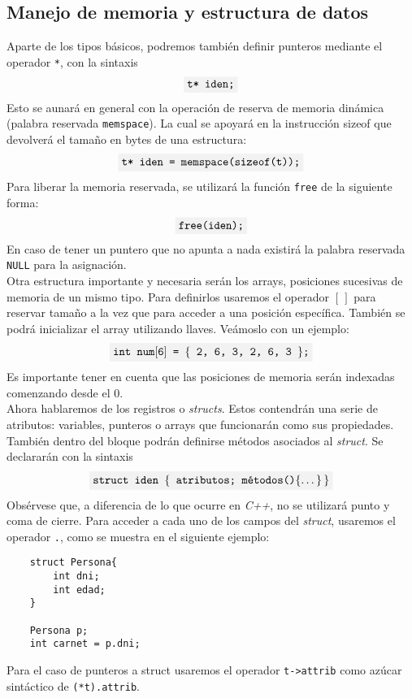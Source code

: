\documentclass[10pt a4paper]{article}
\newcommand{\code}[1]{\colorbox{light-gray}{\texttt{#1}}}
\numberwithin{equation}{section}
\begin{document}
\subsection{Manejo de memoria y estructura de datos}
Aparte de los tipos básicos, podremos también definir punteros mediante el operador \code{*}, con la sintaxis
\begin{equation*}
    \code{t* iden;}
\end{equation*}
Esto se aunará en general con la operación de reserva de memoria dinámica (palabra reservada \code{memspace}). La cual se apoyará en la instrucción sizeof que devolverá el tamaño en bytes de una estructura:
\begin{equation*}
    \code{t* iden = memspace(sizeof(t));}
\end{equation*}
Para liberar la memoria reservada, se utilizará la función \code{free} de la siguiente forma:
\begin{equation*}
    \code{free(iden);}
\end{equation*}
En caso de tener un puntero que no apunta a nada existirá la palabra reservada \code{NULL} para la asignación. \\
\newline
Otra estructura importante y necesaria serán los arrays, posiciones sucesivas de memoria de un mismo tipo. Para definirlos usaremos el operador $[\,]$ para reservar tamaño a la vez que para acceder a una posición específica.
También se podrá inicializar el array utilizando llaves. Veámoslo con un ejemplo:
\begin{equation*}
    \code{int num$[$6$]$ = $\{$ 2, 6, 3, 2, 6, 3 $\}$;}
\end{equation*}
Es importante tener en cuenta que las posiciones de memoria serán indexadas comenzando desde el 0. \\
\newline
Ahora hablaremos de los registros o \textit{structs}. Estos contendrán una serie de atributos: variables, punteros o arrays que funcionarán como sus propiedades. También dentro del bloque podrán definirse métodos asociados al \textit{struct}. Se declararán con la sintaxis
\begin{equation*}
    \code{struct iden $\{$ atributos; métodos()$\{\dots\} \, \}$}
\end{equation*}
Obsérvese que, a diferencia de lo que ocurre en \textit{C++}, no se utilizará punto y coma de cierre. Para acceder a cada uno de los campos del \textit{struct}, usaremos el operador \code{.}, como se muestra en el siguiente ejemplo:
\begin{verbatim}
    struct Persona{
        int dni;
        int edad;
    }

    Persona p;
    int carnet = p.dni;
\end{verbatim}
Para el caso de punteros a struct usaremos el operador \code{t->attrib} como azúcar sintáctico de \code{(*t).attrib}.
\end{document}
